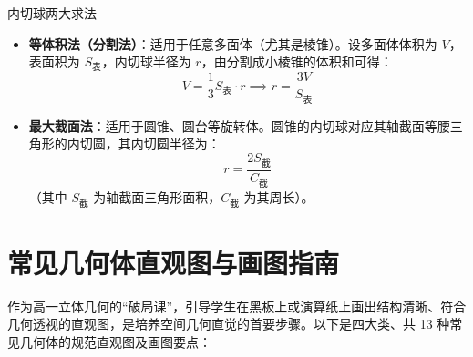 \documentclass[11pt,a4paper]{ctexart}
\begin{document}
\begin{teachbox}{内切球两大求法}
\begin{itemize}
  \item \textbf{等体积法（分割法）}：适用于任意多面体（尤其是棱锥）。设多面体体积为 $V$，表面积为 $S_{\text{表}}$，内切球半径为 $r$，由分割成小棱锥的体积和可得：
    \[ V = \frac{1}{3} S_{\text{表}} \cdot r \implies r = \frac{3V}{S_{\text{表}}} \]
  \item \textbf{最大截面法}：适用于圆锥、圆台等旋转体。圆锥的内切球对应其轴截面等腰三角形的内切圆，其内切圆半径为：
    \[ r = \frac{2S_{\text{截}}}{C_{\text{截}}} \]
    （其中 $S_{\text{截}}$ 为轴截面三角形面积，$C_{\text{截}}$ 为其周长）。
\end{itemize}
\end{teachbox}


\newpage

\section{常见几何体直观图与画图指南}

作为高一立体几何的“破局课”，引导学生在黑板上或演算纸上画出结构清晰、符合几何透视的直观图，是培养空间几何直觉的首要步骤。以下是四大类、共 13 种常见几何体的规范直观图及画图要点：
\end{document}
